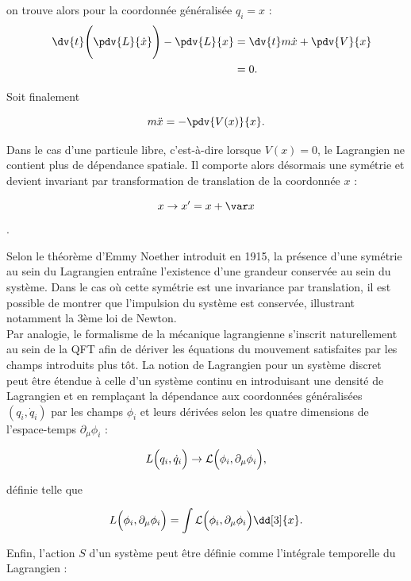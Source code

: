         on trouve alors pour la coordonnée généralisée $q_i=x$ :
        \begin{equation*}
        \begin{split}
            \quad \dv{t}\Biggl(\pdv{L}{\dot x}\Biggr)-\pdv{L}{x} & = \dv{t}m\dot x + \pdv{V}{x} \\
            & = 0.
        \end{split}
        \end{equation*}

        Soit finalement

        \begin{equation}
            m\ddot x = -\pdv{V(x)}{x}.
        \end{equation}

        Dans le cas d'une particule libre, c'est-à-dire lorsque $V(x)=0$, le Lagrangien ne contient plus de dépendance spatiale. Il comporte alors désormais une symétrie et devient invariant par transformation de translation de la coordonnée $x$ :

        $$x\rightarrow x' = x+\var x$$.

        Selon le théorème d'Emmy Noether introduit en 1915, la présence d'une symétrie au sein du Lagrangien entraîne l'existence d'une grandeur conservée au sein du système. Dans le cas où cette symétrie est une invariance par translation, il est possible de montrer que l'impulsion du système est conservée, illustrant notamment la 3ème loi de Newton. \\

        Par analogie, le formalisme de la mécanique lagrangienne s'inscrit naturellement au sein de la QFT afin de dériver les équations du mouvement satisfaites par les champs introduits plus tôt. La notion de Lagrangien pour un système discret peut être étendue à celle d'un système continu en introduisant une densité de Lagrangien et en remplaçant la dépendance aux coordonnées généralisées $(q_i,\dot q_i)$ par les champs $\phi_i$ et leurs dérivées selon les quatre dimensions de l'espace-temps $\partial_{\mu}\phi_i$ :

        $$L\Bigl(q_i,\dot q_i\Bigr)\rightarrow\mathcal{L}\Bigl(\phi_i,\partial_{\mu}\phi_i\Bigr),$$

        définie telle que 
        
        $$L\Bigl(\phi_i,\partial_{\mu}\phi_i\Bigr)=\int\mathcal{L}\Bigl(\phi_i,\partial_{\mu}\phi_i\Bigr)\dd[3]{x}.$$

        Enfin, l'action $S$ d'un système peut être définie comme l'intégrale temporelle du Lagrangien :

